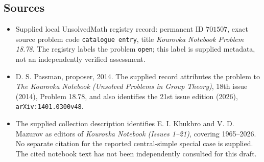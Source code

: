 \documentclass[11pt]{article}
\begin{document}
\subsection{Sources}
\begin{itemize}
\item Supplied local UnsolvedMath registry record: permanent ID \(701507\), exact source problem code \texttt{catalogue entry}, title \emph{Kourovka Notebook Problem 18.78}. The registry labels the problem \texttt{open}; this label is supplied metadata, not an independently verified assessment.
\item D. S. Passman, proposer, 2014. The supplied record attributes the problem to \emph{The Kourovka Notebook (Unsolved Problems in Group Theory)}, 18th issue (2014), Problem 18.78, and also identifies the 21st issue edition (2026), \texttt{arXiv:1401.0300v48}.
\item The supplied collection description identifies E. I. Khukhro and V. D. Mazurov as editors of \emph{Kourovka Notebook (Issues 1--21)}, covering 1965--2026. No separate citation for the reported central-simple special case is supplied. The cited notebook text has not been independently consulted for this draft.
\end{itemize}
\end{document}
